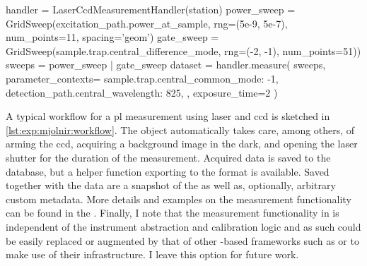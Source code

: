 \begin{listing}[htpb]
    \begin{py}
        handler = LaserCcdMeasurementHandler(station)
        power_sweep = GridSweep(excitation_path.power_at_sample,
                                rng=(5e-9, 5e-7), num_points=11,
                                spacing='geom')
        gate_sweep = GridSweep(sample.trap.central_difference_mode,
                               rng=(-2, -1), num_points=51))
        sweeps = power_sweep | gate_sweep
        dataset = handler.measure(
            sweeps,
            parameter_contexts={
                sample.trap.central_common_mode: -1,
                detection_path.central_wavelength: 825,
            },
            exposure_time=2
        )
    \end{py}
    \caption[\mjolnir measurement workflow]{
    Setup and measurement workflow using the \mjolnir package.
         is a \qcodes {} object managing the instruments.
        The  object describes a nested loop on whose inner iteration the difference mode parameter of the trap's central gate is swept over a linear grid and on whose outer iteration the laser power, adjusted for the \acrlong{bs} ratio, is swept over a logarithmically spaced grid.
        No dependent parameters ( objects) need to be explicitly specified as the  measures the \gls{ccd} spectrum as well as laser power and leakage currents of the swept gates by default.
        The  argument is used to set the spectrometer wavelength to \qty{825}{\nano\meter} and the common mode voltage of the active trap to \qty{-1}{\volt}.
        The  argument is passed through to the  method, where it is used to set up the \gls{ccd} for acquisition.
    }
    \label{lst:exp:mjolnir:workflow}
\end{listing}

A typical workflow for a \gls{pl} measurement using laser and \gls{ccd} is sketched in \cref{lst:exp:mjolnir:workflow}.
The  object automatically takes care, among others, of arming the \gls{ccd}, acquiring a background image in the dark, and opening the laser shutter for the duration of the measurement.
Acquired data is saved to the \qcodes database, but a helper function exporting to the   format is available.
Saved together with the data are a snapshot of the \qcodes {} as well as, optionally, arbitrary custom metadata.
More details and examples on the measurement functionality can be found in the .
Finally, I note that the measurement functionality in \mjolnir is independent of the instrument abstraction and calibration logic and as such could be easily
replaced or augmented by that of other \qcodes-based frameworks such as  or  to make use of their infrastructure.
I leave this option for future work.

